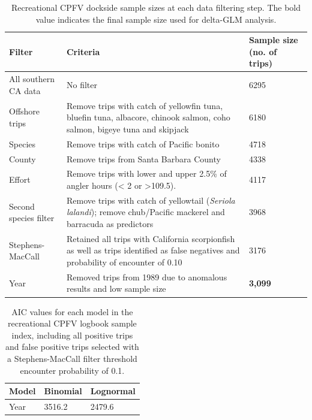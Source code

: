 \documentclass[12pt,]{article}
\begin{document}
\begin{table}[ht]
\centering
\caption{Recreational CPFV dockside sample 
                                          sizes at each data filtering step.  
                                          The bold value indicates the final sample size 
                                          used for delta-GLM analysis.} 
\label{tab:Fleet5_RecPC_dockside_filter}
\begin{tabular}{>{\raggedright}p{1.5in}>{\raggedright}p{3in}>{\raggedright}p{1in}}
  \hline
Filter & Criteria & Sample size (no. of trips) \\ 
  \hline
All southern CA data & No filter & 6295 \\ 
  Offshore trips & Remove trips with catch of yellowfin tuna, bluefin tuna, albacore, chinook salmon, coho salmon, bigeye tuna and skipjack & 6180 \\ 
  Species &  Remove trips with  catch of Pacific bonito & 4718 \\ 
  County &  Remove trips from Santa Barbara County & 4338 \\ 
  Effort & Remove trips with lower and upper 2.5\% of angler hours (< 2 or   >109.5). & 4117 \\ 
  Second species filter & Remove trips with catch of yellowtail (\emph{Seriola lalandi}); remove chub/Pacific mackerel and barracuda as predictors & 3968 \\ 
  Stephens-MacCall & Retained all trips with California scorpionfish as well as trips identified as false negatives and probability of encounter of 0.10 & 3176 \\ 
  Year & Removed trips from 1989 due to anomalous results and low sample size  & \textbf{3,099} \\ 
   \hline
\end{tabular}
\end{table}\begin{table}[ht]
\centering
\caption{AIC values for each model in the
                                          recreational CPFV logbook sample 
                                          index, including all positive trips 
                                          and false positive trips selected 
                                          with a Stephens-MacCall filter 
                                          threshold encounter probability of 0.1.} 
\label{tab:Fleet5_RecPC_dockside_aic}
\begin{tabular}{lll}
  \hline
Model & Binomial & Lognormal \\ 
  \hline
Year & 3516.2 & 2479.6 \\ 

\end{tabular}
\end{table}
\end{document}
